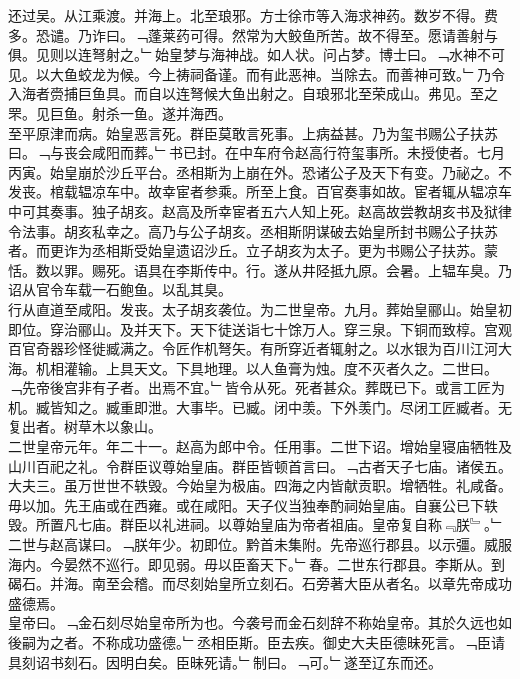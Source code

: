 \documentclass{zhvt-classic}
\begin{document}
\hspace*{2em}还过吴。从江乘渡。并海上。北至琅邪。方士徐巿等入海求神药。数岁不得。费多。恐谴。乃诈曰。﹁蓬莱药可得。然常为大鲛鱼所苦。故不得至。愿请善射与俱。见则以连弩射之。﹂始皇梦与海神战。如人状。问占梦。博士曰。﹁水神不可见。以大鱼蛟龙为候。今上祷祠备谨。而有此恶神。当除去。而善神可致。﹂乃令入海者赍捕巨鱼具。而自以连弩候大鱼出射之。自琅邪北至荣成山。弗见。至之罘。见巨鱼。射杀一鱼。遂并海西。\\
\hspace*{2em}至平原津而病。始皇恶言死。群臣莫敢言死事。上病益甚。乃为玺书赐公子扶苏曰。﹁与丧会咸阳而葬。﹂书已封。在中车府令赵高行符玺事所。未授使者。七月丙寅。始皇崩於沙丘平台。丞相斯为上崩在外。恐诸公子及天下有变。乃祕之。不发丧。棺载辒凉车中。故幸宦者参乘。所至上食。百官奏事如故。宦者辄从辒凉车中可其奏事。独子胡亥。赵高及所幸宦者五六人知上死。赵高故尝教胡亥书及狱律令法事。胡亥私幸之。高乃与公子胡亥。丞相斯阴谋破去始皇所封书赐公子扶苏者。而更诈为丞相斯受始皇遗诏沙丘。立子胡亥为太子。更为书赐公子扶苏。蒙恬。数以罪。赐死。语具在李斯传中。行。遂从井陉抵九原。会暑。上辒车臭。乃诏从官令车载一石鲍鱼。以乱其臭。\\
\hspace*{2em}行从直道至咸阳。发丧。太子胡亥袭位。为二世皇帝。九月。葬始皇郦山。始皇初即位。穿治郦山。及并天下。天下徒送诣七十馀万人。穿三泉。下铜而致椁。宫观百官奇器珍怪徙臧满之。令匠作机弩矢。有所穿近者辄射之。以水银为百川江河大海。机相灌输。上具天文。下具地理。以人鱼膏为烛。度不灭者久之。二世曰。﹁先帝後宫非有子者。出焉不宜。﹂皆令从死。死者甚众。葬既已下。或言工匠为机。臧皆知之。臧重即泄。大事毕。已臧。闭中羡。下外羡门。尽闭工匠臧者。无复出者。树草木以象山。\\
\hspace*{2em}二世皇帝元年。年二十一。赵高为郎中令。任用事。二世下诏。增始皇寝庙牺牲及山川百祀之礼。令群臣议尊始皇庙。群臣皆顿首言曰。﹁古者天子七庙。诸侯五。大夫三。虽万世世不轶毁。今始皇为极庙。四海之内皆献贡职。增牺牲。礼咸备。毋以加。先王庙或在西雍。或在咸阳。天子仪当独奉酌祠始皇庙。自襄公已下轶毁。所置凡七庙。群臣以礼进祠。以尊始皇庙为帝者祖庙。皇帝复自称﹃朕﹄。﹂\\
\hspace*{2em}二世与赵高谋曰。﹁朕年少。初即位。黔首未集附。先帝巡行郡县。以示彊。威服海内。今晏然不巡行。即见弱。毋以臣畜天下。﹂春。二世东行郡县。李斯从。到碣石。并海。南至会稽。而尽刻始皇所立刻石。石旁著大臣从者名。以章先帝成功盛德焉。\\
\hspace*{2em}皇帝曰。﹁金石刻尽始皇帝所为也。今袭号而金石刻辞不称始皇帝。其於久远也如後嗣为之者。不称成功盛德。﹂丞相臣斯。臣去疾。御史大夫臣德昧死言。﹁臣请具刻诏书刻石。因明白矣。臣昧死请。﹂制曰。﹁可。﹂遂至辽东而还。\\
\end{document}

